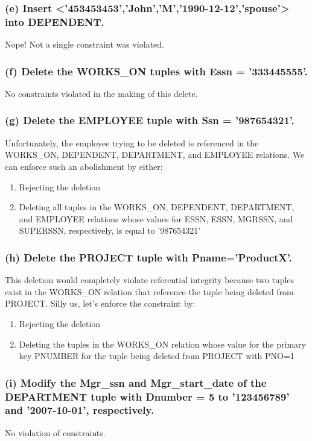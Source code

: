\subsubsection*{(e) Insert <'453453453','John','M','1990-12-12','spouse'> into DEPENDENT.}
Nope! Not a single constraint was violated.

\subsubsection*{(f) Delete the WORKS\_ON tuples with Essn = '333445555'.}
No constraints violated in the making of this delete.

\subsubsection*{(g) Delete the EMPLOYEE tuple with Ssn = '987654321'.}
Unfortunately, the employee trying to be deleted is referenced in the WORKS\_ON, DEPENDENT, DEPARTMENT, and EMPLOYEE relations. We can enforce such an abolishment by either:
\begin{enumerate}
\item Rejecting the deletion
\item Deleting all tuples in the WORKS\_ON, DEPENDENT, DEPARTMENT, and EMPLOYEE relations whose values for ESSN, ESSN, MGRSSN, and SUPERSSN, respectively, is equal to '987654321'
\end{enumerate}

\subsubsection*{(h) Delete the PROJECT tuple with Pname='ProductX'.}
This deletion would completely violate referential integrity because two tuples exist in the WORKS\_ON relation that reference the tuple being deleted from PROJECT. Silly us,  let's enforce the constraint by:
\begin{enumerate} 
\item Rejecting the deletion
\item Deleting the tuples in the WORKS\_ON relation whose value for the primary key PNUMBER for the tuple being deleted from PROJECT with PNO=1
\end{enumerate}

\subsubsection*{(i) Modify the Mgr\_ssn and Mgr\_start\_date of the DEPARTMENT tuple with Dnumber = 5 to '123456789' and '2007-10-01', respectively.}
No violation of constraints.

